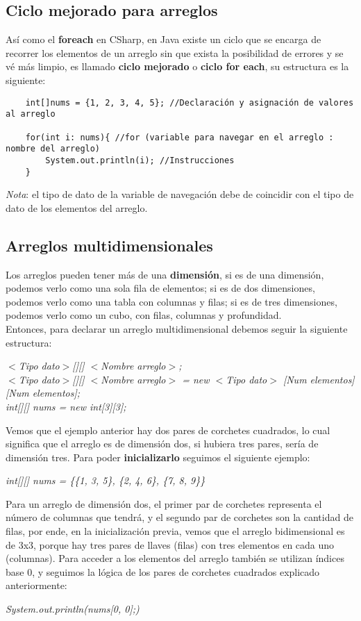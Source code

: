 \subsection{Ciclo mejorado para arreglos}
Así como el \textbf{foreach} en CSharp, en Java existe un ciclo que se encarga de recorrer los elementos de un arreglo sin que exista la posibilidad de errores y se vé más limpio, es llamado \textbf{ciclo mejorado} o \textbf{ciclo for each}, su estructura es la siguiente:
\begin{lstlisting}
    int[]nums = {1, 2, 3, 4, 5}; //Declaración y asignación de valores al arreglo
        
    for(int i: nums){ //for (variable para navegar en el arreglo : nombre del arreglo)
        System.out.println(i); //Instrucciones
    }
\end{lstlisting}
\textit{Nota}: el tipo de dato de la variable de navegación debe de coincidir con el tipo de dato de los elementos del arreglo.

\subsection{Arreglos multidimensionales}
Los arreglos pueden tener más de una \textbf{dimensión}, si es de una dimensión, podemos verlo como una sola fila de elementos; si es de dos dimensiones, podemos verlo como una tabla con columnas y filas; si es de tres dimensiones, podemos verlo como un cubo, con filas, columnas y profundidad.\\
Entonces, para declarar un arreglo multidimensional debemos seguir la siguiente estructura:\begin{center}\textit{$<$Tipo dato$>$[][] $<$Nombre arreglo$>$;\\$<$Tipo dato$>$[][] $<$Nombre arreglo$>$ = new $<$Tipo dato$>$ [Num elementos][Num elementos];\\int[][] nums = new int[3][3];}\end{center}
Vemos que el ejemplo anterior hay dos pares de corchetes cuadrados, lo cual significa que el arreglo es de dimensión dos, si hubiera tres pares, sería de dimensión tres. Para poder \textbf{inicializarlo} seguimos el siguiente ejemplo:\begin{center}\textit{int[][] nums = \{\{1, 3, 5\}, \{2, 4, 6\}, \{7, 8, 9\}\}}\end{center}
Para un arreglo de dimensión dos, el primer par de corchetes representa el número de columnas que tendrá, y el segundo par de corchetes son la cantidad de filas, por ende, en la inicialización previa, vemos que el arreglo bidimensional es de 3x3, porque hay tres pares de llaves (filas) con tres elementos en cada uno (columnas).
Para acceder a los elementos del arreglo también se utilizan índices base 0, y seguimos la lógica de los pares de corchetes cuadrados explicado anteriormente:\begin{center}\textit{System.out.println(nums[0, 0];)}\end{center}


